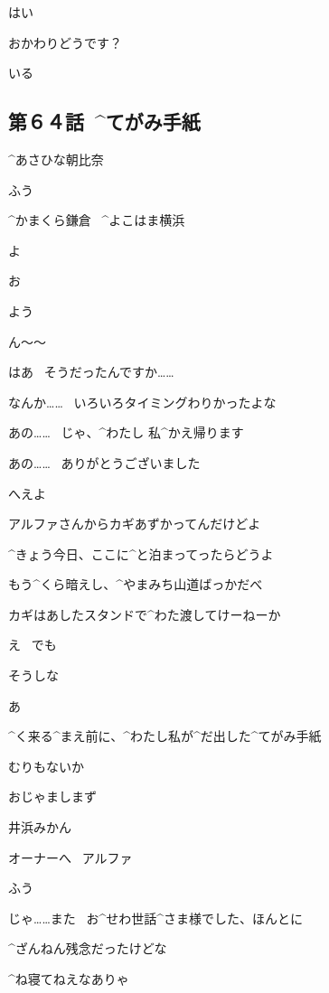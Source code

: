 \Alpha はい

\page[128]
\Alpha おかわりどうです？

\Ojisan いる


\subsection{第６４話\ ^{てがみ}{手紙}}

\page[130]
\Sign ^{あさひな}{朝比奈}

\Alpha ふう

\Sign ^{かまくら}{鎌倉}
\ ^{よこはま}{横浜}

\page[131]
\Alpha よ

\page[135]
\Ojisan お

\page[137]
\Ojisan よう

\Ojisan ん〜〜

\page[138]
\Kokone はあ
\ そうだったんですか……

\Ojisan なんか……
\ いろいろタイミングわりかったよな

\Kokone あの……
\ じゃ、^{わたし }{私}^{かえ}{帰}ります

\Kokone あの……
\ ありがとうございました

\page[139]
\Ojisan へえよ

\Ojisan アルファさんからカギあずかってんだけどよ

\Ojisan ^{きょう}{今日}、ここに^{と}{泊}まってったらどうよ

\Ojisan もう^{くら}{暗}えし、^{やまみち}{山道}ばっかだべ

\Ojisan カギはあしたスタンドで^{わた}{渡}してけーねーか

\Kokone え
\ でも

\Ojisan そうしな

\page[140]
\Kokone あ

\Kokone ^{く}{来}る^{まえ}{前}に、^{わたし}{私}が^{だ}{出}した^{てがみ}{手紙}

\Kokone むりもないか

\page[141]
\Kokone おじゃましまず

\Sign 井浜みかん

\page[142]
\Sign オーナーへ
\ アルファ

\page[143]
\Kokone ふう

\page[144]
\Kokone じゃ……また
\ お^{せわ}{世話}^{さま}{様}でした、ほんとに

\Ojisan ^{ざんねん}{残念}だったけどな

\Ojisan ^{ね}{寝}てねえなありゃ


